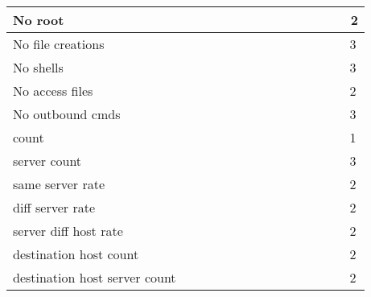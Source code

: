 \documentclass[conference]{IEEEtran}
\begin{document}
\begin{strip}
\begin{multicols}{2}
\begin{flushleft}
\begin{tabular}{l m{3mm} | m{3mm} | m{3mm} | m{3mm} | m{3mm} | m{3mm} | m{3mm} | m{3mm} | m{4mm} | m{3mm} | m{3mm} | m{3mm} | m{3mm} |}
            \hline
            \multicolumn{1}{|l|}{\tiny No root}& & & \cellcolor[gray]{0}& & & & \cellcolor[gray]{0}& & & & & & \cellcolor[gray]{0.7} \tiny ~2\\
            \hline
            \multicolumn{1}{|l|}{\tiny No file creations}& & \cellcolor[gray]{0}& \cellcolor[gray]{0}& & & & & \cellcolor[gray]{0}& & & & & \cellcolor[gray]{0.7} \tiny ~3\\
            \hline
            \multicolumn{1}{|l|}{\tiny No shells}& & & & & \cellcolor[gray]{0}& & \cellcolor[gray]{0}& & & & \cellcolor[gray]{0}& & \cellcolor[gray]{0.7} \tiny ~3\\
            \hline
            \multicolumn{1}{|l|}{\tiny No access files}& & & & & \cellcolor[gray]{0}& & & & & \cellcolor[gray]{0}& & & \cellcolor[gray]{0.7} \tiny ~2\\
            \hline
            \multicolumn{1}{|l|}{\tiny No outbound cmds}& & & & & \cellcolor[gray]{0}& & & & & \cellcolor[gray]{0}& & \cellcolor[gray]{0}& \cellcolor[gray]{0.7} \tiny ~3\\
            \hline
            \multicolumn{1}{|l|}{\tiny count}& & & & \cellcolor[gray]{0}& & & & & & & & & \cellcolor[gray]{0.7} \tiny ~1\\
            \hline
            \multicolumn{1}{|l|}{\tiny server count}& & & & & & \cellcolor[gray]{0}& & & \cellcolor[gray]{0}& & \cellcolor[gray]{0}& & \cellcolor[gray]{0.7} \tiny ~3\\
            \hline
            \multicolumn{1}{|l|}{\tiny same server rate}& \cellcolor[gray]{0}& & & & & & & & & \cellcolor[gray]{0}& & & \cellcolor[gray]{0.7} \tiny ~2\\
            \hline
            \multicolumn{1}{|l|}{\tiny diff server rate}& & & \cellcolor[gray]{0}& & & & & & & & & \cellcolor[gray]{0}& \cellcolor[gray]{0.7} \tiny ~2\\
            \hline
            \multicolumn{1}{|l|}{\tiny server diff host rate}& & & & & & \cellcolor[gray]{0}& & \cellcolor[gray]{0}& & & & & \cellcolor[gray]{0.7} \tiny ~2\\
            \hline
            \multicolumn{1}{|l|}{\tiny destination host count}& & & & & & & & & \cellcolor[gray]{0}& & & \cellcolor[gray]{0}& \cellcolor[gray]{0.7} \tiny ~2\\
            \hline
            \multicolumn{1}{|l|}{\tiny destination host server count}& & & & \cellcolor[gray]{0}& & & & & & & & \cellcolor[gray]{0}& \cellcolor[gray]{0.7} \tiny ~2\\
            \hline

\end{tabular}
\end{flushleft}
\end{multicols}
\end{strip}
\end{document}
